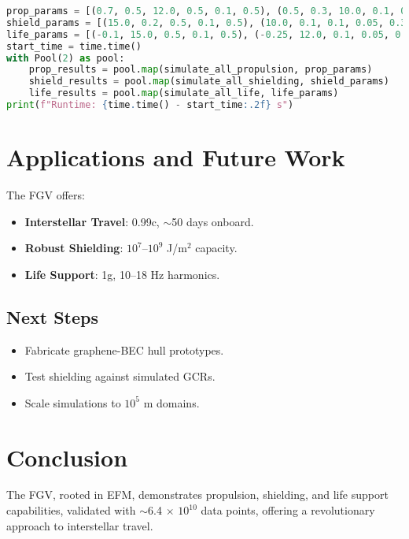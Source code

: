 \documentclass[11pt]{article}
\begin{document}
\begin{lstlisting}[language=Python, caption={Fluxonic Gravitational Vehicle Simulation}, label={lst:fgv}]
prop_params = [(0.7, 0.5, 12.0, 0.5, 0.1, 0.5), (0.5, 0.3, 10.0, 0.1, 0.05, 0.3)]
shield_params = [(15.0, 0.2, 0.5, 0.1, 0.5), (10.0, 0.1, 0.1, 0.05, 0.3)]
life_params = [(-0.1, 15.0, 0.5, 0.1, 0.5), (-0.25, 12.0, 0.1, 0.05, 0.3)]
start_time = time.time()
with Pool(2) as pool:
    prop_results = pool.map(simulate_all_propulsion, prop_params)
    shield_results = pool.map(simulate_all_shielding, shield_params)
    life_results = pool.map(simulate_all_life, life_params)
print(f"Runtime: {time.time() - start_time:.2f} s")
\end{lstlisting}

\section{Applications and Future Work}
The FGV offers:
\begin{itemize}
    \item \textbf{Interstellar Travel}: 0.99c, $\sim$50 days onboard.
    \item \textbf{Robust Shielding}: $10^7$--$10^9$ J/m$^2$ capacity.
    \item \textbf{Life Support}: 1g, 10--18 Hz harmonics.
\end{itemize}
\subsection{Next Steps}
\begin{itemize}
    \item Fabricate graphene-BEC hull prototypes.
    \item Test shielding against simulated GCRs.
    \item Scale simulations to $10^5$ m domains.
\end{itemize}

\section{Conclusion}
The FGV, rooted in EFM, demonstrates propulsion, shielding, and life support capabilities, validated with $\sim$6.4 $\times$ $10^{10}$ data points, offering a revolutionary approach to interstellar travel.
\end{document}
